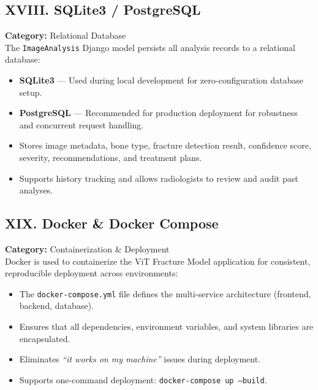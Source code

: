 \documentclass[a4paper,12pt]{report}
\begin{document}
    \subsection*{XVIII. SQLite3 / PostgreSQL}
    \textbf{Category:} Relational Database\\
    The \texttt{ImageAnalysis} Django model persists all analysis records to a relational database:
    \begin{itemize}
        \item \textbf{SQLite3} — Used during local development for zero-configuration database setup.
        \item \textbf{PostgreSQL} — Recommended for production deployment for robustness and concurrent request handling.
        \item Stores image metadata, bone type, fracture detection result, confidence score, severity, recommendations, and treatment plans.
        \item Supports history tracking and allows radiologists to review and audit past analyses.
    \end{itemize}

    \subsection*{XIX. Docker \& Docker Compose}
    \textbf{Category:} Containerization \& Deployment\\
    Docker is used to containerize the ViT Fracture Model application for consistent, reproducible deployment across environments:
    \begin{itemize}
        \item The \texttt{docker-compose.yml} file defines the multi-service architecture (frontend, backend, database).
        \item Ensures that all dependencies, environment variables, and system libraries are encapsulated.
        \item Eliminates \textit{``it works on my machine''} issues during deployment.
        \item Supports one-command deployment: \texttt{docker-compose up --build}.
    \end{itemize}

\end{document}
